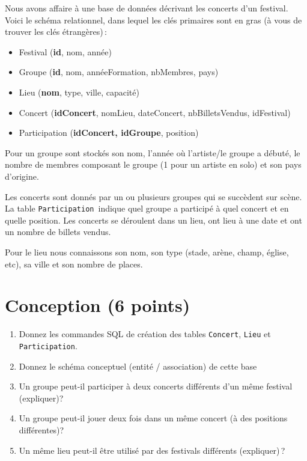
Nous avons affaire à une base de données décrivant les concerts d'un festival.
Voici le schéma 
 relationnel, dans lequel les clés primaires sont en gras
(à vous de trouver les clés étrangères)\,:

\begin{itemize}
    \item Festival (\textbf{id}, nom, année)
  \item Groupe (\textbf{id}, nom, annéeFormation, nbMembres, pays)
   \item Lieu (\textbf{nom}, type, ville, capacité)
   \item Concert (\textbf{idConcert}, nomLieu, dateConcert, nbBilletsVendus, idFestival)
   \item Participation (\textbf{idConcert, idGroupe}, position)
\end{itemize}

Pour un groupe sont stockés son nom, l'année où 
l'artiste/le groupe a débuté, le nombre de membres 
composant le groupe (1 pour un artiste en solo) et son pays d'origine.

Les concerts sont donnés par un ou plusieurs groupes qui se succèdent sur scène.
La table \texttt{Participation} indique quel groupe a participé à quel concert et en quelle position.
Les concerts se déroulent dans un lieu, ont lieu à une date 
et ont un nombre de billets vendus. 

Pour le lieu nous connaissons son nom, 
son type (stade, arène, champ, église, etc), 
sa ville et son nombre de places. 

\section{Conception (6 points)}

\begin{enumerate}

\item Donnez les commandes SQL de création des tables \texttt{Concert}, \texttt{Lieu}
    et \texttt{Participation}. 

   \item Donnez le schéma conceptuel (entité / association) de cette base

    \item Un groupe peut-il participer à deux concerts différents d'un même festival (expliquer)?
    \item Un groupe peut-il jouer deux fois dans un même concert (à des positions différentes)?
 
    \item Un même lieu peut-il être utilisé par des festivals différents (expliquer)\,?
    
\end{enumerate}

